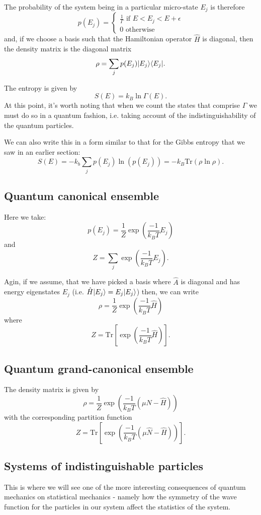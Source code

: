 \documentclass{article}
\begin{document}
The probability of the system being in a particular micro-state $E_j$ is therefore
$$
	p(E_j) =
	\begin{cases}
		\frac{1}{\Gamma} \text{ if } E<E_j<E+\epsilon\\
		0 \text{ otherwise}
	\end{cases}
$$
and, if we choose a basis such that the Hamiltonian operator $\hat{H}$ is diagonal, then the density matrix is the diagonal matrix
$$
	\rho = \sum_j p(E_j) | E_j \rangle\langle E_j |.
$$

The entropy is given by
$$
	S(E) = k_B\ln\Gamma(E).
$$
At this point, it's worth noting that when we count the states that comprise $\Gamma$ we must do so in a quantum fashion, i.e. taking account of the indistinguishability of the quantum particles.

We can also write this in a form similar to that for the Gibbs entropy that we saw in an earlier section:
$$
	S(E) = -k_b\sum_jp(E_j)\ln(p(E_j))=-k_B\text{Tr}(\rho\ln\rho).
$$ 

\subsection*{Quantum canonical ensemble}
Here we take:
$$
	p(E_j) = \frac{1}{Z}\exp\left(\frac{-1}{k_BT}E_j\right)
$$
and
$$
	Z = \sum_j \exp\left(\frac{-1}{k_BT}E_j\right).
$$

Agin, if we assume, that we have picked a basis where $\hat{A}$ is diagonal and has energy eigenstates $E_j$ (i.e. $\hat{H}| E_j \rangle = E_j| E_j \rangle$) then, we can write
$$
	\rho = \frac{1}{Z}\exp\left(\frac{-1}{k_BT}\hat{H}\right)
$$
where
$$
	Z = \text{Tr}\left[\exp\left(\frac{-1}{k_BT}\hat{H}\right)\right].
$$

\subsection*{Quantum grand-canonical ensemble}
The density matrix is given by
$$
	\rho = \frac{1}{Z}\exp\left(\frac{-1}{k_BT}(\mu\hat{N}-\hat{H})\right)
$$
with the corresponding partition function
$$
	Z = \text{Tr}\left[\exp\left(\frac{-1}{k_BT}(\mu\hat{N}-\hat{H})\right)\right].
$$

\subsection*{Systems of indistinguishable particles}
This is where we will see one of the more interesting consequences of quantum mechanics on statistical mechanics - namely how the symmetry of the wave function for the particles in our system affect the statistics of the system.
\end{document}
